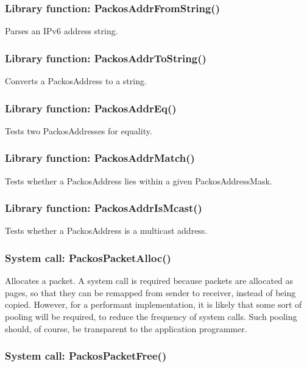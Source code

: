 \documentclass{article}
\begin{document}
\subsubsection{Library function: PackosAddrFromString()}

Parses an IPv6 address string.

\subsubsection{Library function: PackosAddrToString()}

Converts a PackosAddress to a string.

\subsubsection{Library function: PackosAddrEq()}

Tests two PackosAddresses for equality.

\subsubsection{Library function: PackosAddrMatch()}

Tests whether a PackosAddress lies within a given PackosAddressMask.

\subsubsection{Library function: PackosAddrIsMcast()}

Tests whether a PackosAddress is a multicast address.

\subsubsection{System call: PackosPacketAlloc()}

Allocates a packet.  A system call is required because packets are
allocated as pages, so that they can be remapped from sender to
receiver, instead of being copied.  However, for a performant
implementation, it is likely that some sort of pooling will be
required, to reduce the frequency of system calls.  Such pooling
should, of course, be transparent to the application programmer.

\subsubsection{System call: PackosPacketFree()}
\end{document}
